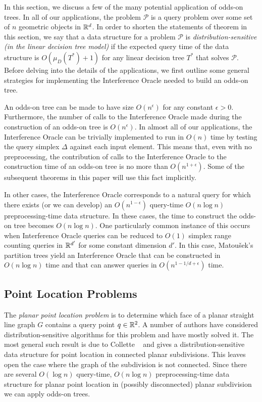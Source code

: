 \documentclass{patmorin}
\begin{document}
In this section, we discuss a few of the many potential application of
odds-on trees.  In all of our applications, the problem $\mathcal{P}$ is a
query problem over some set of $n$ geometric objects in $\mathbb{R}^d$.  In order
to shorten the statements of theorem in this section, we say that a data
structure for a problem $\mathcal{P}$ is \emph{distribution-sensitive
(in the linear decision tree model)} if the expected query time of the
data structure is $O(\mu_D(T^*)+1)$ for any linear decision tree $T^*$
that solves $\mathcal{P}$. Before delving into the details of the
applications, we first outline some general strategies for implementing
the Interference Oracle needed to build an odds-on tree.

An odds-on tree can be made to have size $O(n^\epsilon)$ for any
constant $\epsilon > 0$.  Furthermore, the number of calls to the
Interference Oracle made during the construction of an odds-on tree is
$O(n^\epsilon)$.  In almost all of our applications, the Interference
Oracle can be trivially implemented to run in $O(n)$ time by testing
the query simplex $\Delta$ against each input element.  This means
that, even with no preprocessing, the contribution of calls to the
Interference Oracle to the construction time of an odds-on tree is no more
than $O(n^{1+\epsilon})$.  Some of the subsequent theorems in this paper
will use this fact implicitly.

In other cases, the Interference Oracle corresponds to a natural query for
which there exists (or we can develop) an $O(n^{1-\epsilon})$ query-time
$O(n\log n)$ preprocessing-time data structure.  In these cases, the time
to construct the odds-on tree becomes $O(n\log n)$.  One particularly
common instance of this occurs when Interference Oracle queries can
be reduced to $O(1)$ simplex range counting queries in $\mathbb{R}^{d'}$ for
some constant dimension $d'$.  In this case, Matou\v{s}ek's partition
trees \cite{m92} yield an Interference Oracle that can be constructed in
$O(n\log n)$ time and that can answer queries in $O(n^{1-1/d+\epsilon})$
time. 

\subsection{Point Location Problems}

The \emph{planar point location problem} is to determine which face
of a planar straight line graph $G$ contains a query point $q\in\mathbb{R}^2$.
A number of authors have considered distribution-sensitive algorithms for
this problem \cite{acmr00,amm00,amm01a,amm01b,ammw07,cdilm08,i01,i04} and
have mostly solved it.  The most general such result is due to Collette
\etal\ \cite{cdilm08} and gives a distribution-sensitive data structure
for point location in connected planar subdivisions.  This leaves open
the case where the graph of the subdivision is not connected.  Since there
are several $O(\log n)$ query-time, $O(n\log n)$ preprocessing-time data
structure for planar point location in (possibly disconnected) planar
subdivision \cite{as98,egs86,k83,m90,st86} we can apply odds-on trees.
\end{document}
